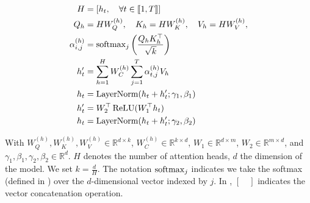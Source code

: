 \begin{align}
H &= \left[h_t, \quad \forall t \in \llbracket 1, T \rrbracket\right] \labeq{transformer:mha-first}\\
Q_h & = H W_Q^{(h)}, \quad K_h = H W_K^{(h)}, \quad V_h = H W_V^{(h)}, \\
\alpha^{(h)}_{i,j} &= \softmax_j \left(\frac{Q_h K_h^{\top}}{\sqrt{k}} \right) \labeq{transformer:alpha}\\
h'_t &= \sum_{h=1}^HW^{(h)}_{C}\sum_{j=1}^T\alpha^{(h)}_{t,j}V_h \labeq{transformer:mha-last}\\
h_t &= \textrm{LayerNorm}(h_t + h'_t; \gamma_1, \beta_1) \labeq{transformer:ffn-start}\\
h'_t &= W_2^{\top}\relu(W_1^{\top}h_t)\\
h_t &= \textrm{LayerNorm}(h_t + h'_t; \gamma_2, \beta_2) \labeq{transformer:ffn-last}
\end{align}

With $W_Q^{(h)}, W_K^{(h)}, W_V^{(h)} \in \mathbb{R}^{d\times k}$, $W^{(h)}_{C} \in \mathbb{R}^{k\times d}$, $W_1 \in \mathbb{R}^{d \times m}$, $W_2 \in \mathbb{R}^{m \times d}$, and $\gamma_1, \beta_1, \gamma_2, \beta_2 \in \mathbb{R}^d$. $H$ denotes the number of attention heads, $d$ the dimension of the model. We set $k = \frac{d}{H}$. The notation $\operatorname{softmax}_j$ indicates we take the softmax (defined in ) over the $d$-dimensional
vector indexed by $j$. In , $\left[ \quad \right]$ indicates the vector concatenation operation.



